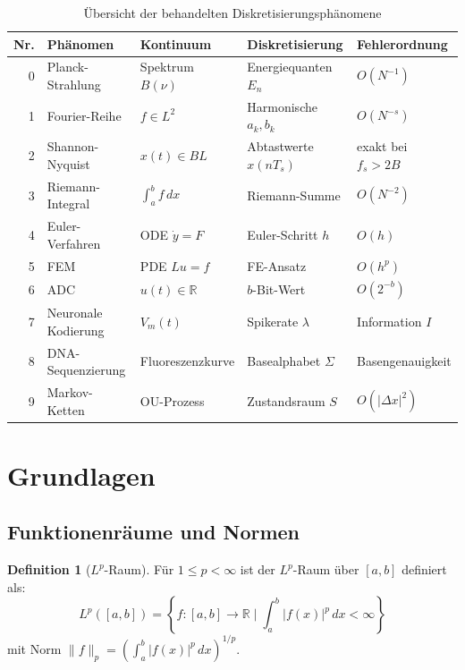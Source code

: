 ﻿\documentclass[a4paper,12pt]{article}
\theoremstyle{definition}
\newtheorem{definition}{Definition}
\begin{document}
\begin{table}[h]
\centering
\begin{tabular}{rllll}
\toprule
\textbf{Nr.} & \textbf{Phänomen} & \textbf{Kontinuum} & \textbf{Diskretisierung} & \textbf{Fehlerordnung}\\
\midrule
0 & Planck-Strahlung & Spektrum $B(\nu)$ & Energiequanten $E_n$ & $O(N^{-1})$\\
1 & Fourier-Reihe & $f \in L^2$ & Harmonische $a_k, b_k$ & $O(N^{-s})$\\
2 & Shannon-Nyquist & $x(t) \in BL$ & Abtastwerte $x(nT_s)$ & exakt bei $f_s > 2B$\\
3 & Riemann-Integral & $\int_a^b f\,dx$ & Riemann-Summe & $O(N^{-2})$\\
4 & Euler-Verfahren & ODE $\dot{y}=F$ & Euler-Schritt $h$ & $O(h)$\\
5 & FEM & PDE $Lu=f$ & FE-Ansatz & $O(h^p)$\\
6 & ADC & $u(t)\in\mathbb{R}$ & $b$-Bit-Wert & $O(2^{-b})$\\
7 & Neuronale Kodierung & $V_m(t)$ & Spikerate $\lambda$ & Information $I$\\
8 & DNA-Sequenzierung & Fluoreszenzkurve & Basealphabet $\Sigma$ & Basengenauigkeit\\
9 & Markov-Ketten & OU-Prozess & Zustandsraum $S$ & $O(|\Delta x|^2)$\\
\bottomrule
\end{tabular}
\caption{Übersicht der behandelten Diskretisierungsphänomene}
\end{table}

\section{Grundlagen}

\subsection{Funktionenräume und Normen}

\begin{definition}[$L^p$-Raum]
    Für $1 \leq p < \infty$ ist der $L^p$-Raum über $[a,b]$ definiert als:
    \[
    L^p([a,b]) = \left\{ f : [a,b] \to \mathbb{R} \;\Big|\; \int_a^b |f(x)|^p\,dx < \infty \right\}
    \]
    mit Norm $\|f\|_p = \left(\int_a^b |f(x)|^p\,dx\right)^{1/p}$.
\end{definition}
\end{document}
